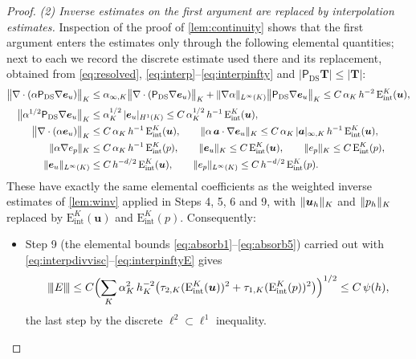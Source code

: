 \documentclass[11pt,a4paper]{article}
\newcommand{\bu}{\boldsymbol{u}}
\newcommand{\ba}{\boldsymbol{a}}
\newcommand{\beu}{\boldsymbol{e}_{u}}
\newcommand{\buh}{\boldsymbol{u}_h}
\newcommand{\ViscProj}{\mathsf{P}_{\mathrm{DS}}}
\DeclarePairedDelimiter{\norm}{\lVert}{\rVert}
\newcommand{\triplenorm}[1]{{\lvert\kern-0.25ex\lvert\kern-0.25ex\lvert #1
\rvert\kern-0.25ex\rvert\kern-0.25ex\rvert}}
\newcommand{\Eint}[2]{\mathrm{E}^{#1}_{\mathrm{int}}(#2)}
\theoremstyle{plain}
\theoremstyle{remark}
\theoremstyle{definition}
\numberwithin{equation}{section}
\begin{document}
\begin{proof}
\smallskip\noindent\emph{(2) Inverse estimates on the first argument are replaced by
interpolation estimates.}
Inspection of the proof of \cref{lem:continuity} shows that the first argument enters the
estimates only through the following elemental quantities; next to each we record the
discrete estimate used there and its replacement, obtained from \eqref{eq:resolved},
\eqref{eq:interp}--\eqref{eq:interpinfty} and
$|\ViscProj\mathbf{T}|\le|\mathbf{T}|$:
\begin{align}
  \bigl\lVert\nabla\cdot(\alpha\ViscProj\nabla\beu)\bigr\rVert_K
  &\le \alpha_{\infty,K}\bigl\lVert\nabla\cdot(\ViscProj\nabla\beu)\bigr\rVert_K
   + \norm{\nabla\alpha}_{L^\infty(K)}\bigl\lVert\ViscProj\nabla\beu\bigr\rVert_K
   \le C\,\alpha_K\,h^{-2}\,\Eint{K}{\bu},
  \label{eq:interpdivvisc}\\[2pt]
  \bigl\lVert\alpha^{1/2}\ViscProj\nabla\beu\bigr\rVert_K
  &\le \alpha_K^{1/2}\,|\beu|_{H^1(K)}
   \le C\,\alpha_K^{1/2}\,h^{-1}\,\Eint{K}{\bu},
  \label{eq:interpgrad}\\
  \bigl\lVert\nabla\cdot(\alpha\beu)\bigr\rVert_K
  &\le C\,\alpha_K\,h^{-1}\,\Eint{K}{\bu},
  \qquad
   \norm{\alpha\,\ba\cdot\nabla\beu}_K
   \le C\,\alpha_K\,|\ba|_{\infty,K}\,h^{-1}\,\Eint{K}{\bu},
  \label{eq:interpfirst}\\
  \norm{\alpha\nabla e_p}_K
  &\le C\,\alpha_K\,h^{-1}\,\Eint{K}{p},
  \qquad
   \norm{\beu}_K \le C\,\Eint{K}{\bu},
  \qquad
   \norm{e_p}_K \le C\,\Eint{K}{p},
  \label{eq:interpzero}\\
  \norm{\beu}_{L^\infty(K)}
  &\le C\,h^{-d/2}\,\Eint{K}{\bu},
  \qquad
   \norm{e_p}_{L^\infty(K)} \le C\,h^{-d/2}\,\Eint{K}{p}.
  \label{eq:interpinftyE}
\end{align}
These have exactly the same elemental coefficients as the weighted inverse estimates of
\cref{lem:winv} applied in Steps 4, 5, 6 and 9, with $\norm{\buh}_K$ and $\norm{p_h}_K$
replaced by $\Eint{K}{\bu}$ and $\Eint{K}{p}$. Consequently:
\begin{itemize}[leftmargin=2em]
\item Step 9 (the elemental bounds \eqref{eq:absorb1}--\eqref{eq:absorb5}) carried out
with \eqref{eq:interpdivvisc}--\eqref{eq:interpinftyE} gives
\begin{equation}\label{eq:Enorm}
  \triplenorm{E}
  \le C\Bigl(\sum_{K}\alpha_K^2\,h_K^{-2}\bigl(\tau_{2,K}(\Eint{K}{\bu})^2
  + \tau_{1,K}(\Eint{K}{p})^2\bigr)\Bigr)^{1/2}
  \le C\,\psi(h),
\end{equation}
the last step by the discrete $\ell^2\subset\ell^1$ inequality.

\end{itemize}
\end{proof}
\end{document}
